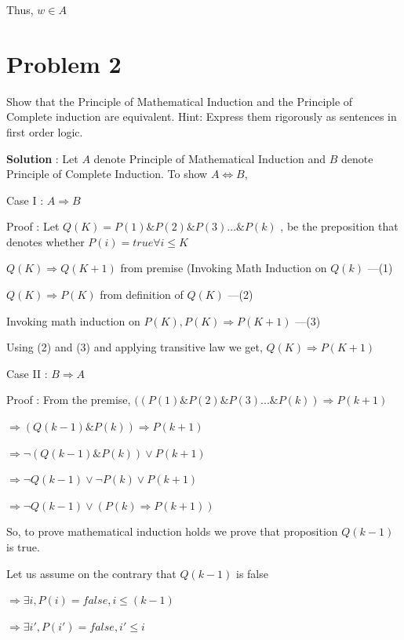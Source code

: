 \documentclass{article}
\begin{document}
    \qquad Thus, $w \in A$
    
    
    \section*{Problem 2} Show that the Principle of Mathematical Induction and the Principle of Complete induction are equivalent.
Hint: Express them rigorously as sentences in first order logic.

    \textbf{Solution} : 
    Let $A$ denote Principle of Mathematical Induction and $B$ denote Principle of Complete Induction. To show $A \iff B$,
    
    Case I : $A \Longrightarrow B$
    
    Proof : Let $Q(K) = P(1) \& P(2) \& P(3) ... \& P(k)$ , be the preposition that denotes whether $P(i) = true \forall i \leq K$
    
    \quad $Q(K) \Longrightarrow Q(K + 1)$ from premise (Invoking Math Induction on $Q(k)$ ---(1)
    
    \quad $Q(K) \Longrightarrow P(K)$ from definition of $Q(K)$ ---(2)
    
    \quad Invoking math induction on $P(K),  P(K) \Longrightarrow P(K + 1)$ ---(3)
    
    \quad Using (2) and (3) and applying transitive law we get, $Q(K) \Longrightarrow P(K + 1)$
    
    Case II : $B \Longrightarrow A$
    
    Proof : From the premise, $((P(1) \& P(2) \& P(3) ... \& P(k)) \Longrightarrow P(k + 1)$
    
    \quad $\Longrightarrow (Q(k - 1) \& P(k)) \Longrightarrow P(k + 1)$
    
    \quad $\Longrightarrow \neg (Q(k - 1) \& P(k)) \lor P(k+1)$

    \quad $\Longrightarrow \neg Q(k - 1) \lor \neg P(k) \lor P(k+1)$

    \quad $\Longrightarrow \neg Q(k - 1) \lor (P(k) \Longrightarrow P(k + 1))$
    
    \quad So, to prove mathematical induction holds we prove that proposition $Q(k - 1)$ is true.
    
    \quad Let us assume on the contrary that $Q(k - 1)$ is false
    
    \quad $\Longrightarrow \exists i, P(i) = false, i \leq (k - 1)$
    
    \quad $\Longrightarrow \exists i', P(i') = false, i' \leq i$
    
\end{document}
